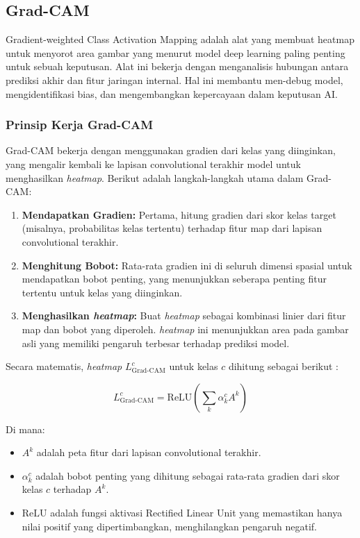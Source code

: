 \subsection{Grad-CAM}
\label{sec:225}

Gradient-weighted Class Activation Mapping adalah alat yang membuat heatmap untuk menyorot area gambar yang menurut model deep learning paling penting untuk sebuah keputusan. Alat ini bekerja dengan menganalisis hubungan antara prediksi akhir dan fitur jaringan internal. Hal ini membantu men-debug model, mengidentifikasi bias, dan mengembangkan kepercayaan dalam keputusan AI.

\subsubsection{Prinsip Kerja Grad-CAM}

Grad-CAM bekerja dengan menggunakan gradien dari kelas yang diinginkan, yang mengalir kembali ke lapisan convolutional terakhir model untuk menghasilkan \emph{heatmap}. Berikut adalah langkah-langkah utama dalam Grad-CAM:

\begin{enumerate}
    \item \textbf{Mendapatkan Gradien:} Pertama, hitung gradien dari skor kelas target (misalnya, probabilitas kelas tertentu) terhadap fitur map dari lapisan convolutional terakhir.
    \item \textbf{Menghitung Bobot:} Rata-rata gradien ini di seluruh dimensi spasial untuk mendapatkan bobot penting, yang menunjukkan seberapa penting fitur tertentu untuk kelas yang diinginkan.
    \item \textbf{Menghasilkan \emph{heatmap}:} Buat \emph{heatmap} sebagai kombinasi linier dari fitur map dan bobot yang diperoleh. \emph{heatmap} ini menunjukkan area pada gambar asli yang memiliki pengaruh terbesar terhadap prediksi model.
\end{enumerate}

Secara matematis, \emph{heatmap} \(L_{\text{Grad-CAM}}^c\) untuk kelas \(c\) dihitung sebagai berikut \parencite{selvaraju2017grad}:

\[
L_{\text{Grad-CAM}}^c = \text{ReLU}\left(\sum_k \alpha_k^c A^k\right)
\]

Di mana:

\begin{itemize}
    \item \(A^k\) adalah peta fitur dari lapisan convolutional terakhir.
    \item \(\alpha_k^c\) adalah bobot penting yang dihitung sebagai rata-rata gradien dari skor kelas \(c\) terhadap \(A^k\).
    \item \(\text{ReLU}\) adalah fungsi aktivasi Rectified Linear Unit yang memastikan hanya nilai positif yang dipertimbangkan, menghilangkan pengaruh negatif.
\end{itemize}

